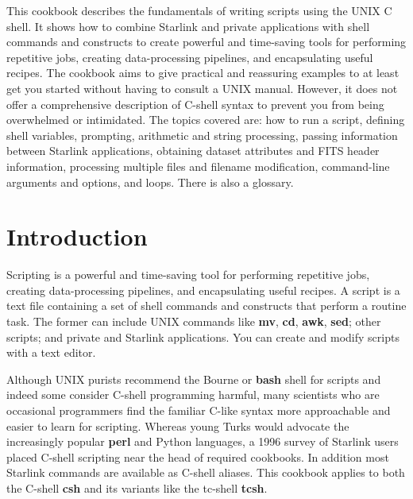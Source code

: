\documentclass[twoside,11pt]{article}
\newcommand{\stardocinitials}  {SC}
\newcommand{\stardocnumber}    {4.4}
\newcommand{\stardocabstract}  {
This cookbook describes the fundamentals of writing scripts using
the UNIX C shell.  It shows how to combine Starlink and private applications
with shell commands and constructs to create powerful and time-saving
tools for performing repetitive jobs, creating data-processing
pipelines, and encapsulating useful recipes.  The cookbook aims to give
practical and reassuring examples to at least get you started without
having to consult a UNIX manual.  However, it does not offer a
comprehensive description of C-shell syntax to prevent you from
being overwhelmed or intimidated.  The topics covered are: how to run a
script, defining shell variables, prompting, arithmetic and string
processing, passing information between Starlink applications, obtaining
dataset attributes and FITS header information, processing multiple
files and filename modification, command-line arguments and options, and
loops.  There is also a glossary.}
\newcommand{\stardocname}{\stardocinitials /\stardocnumber}
\newcommand{\htmladdnormallink}[2]{#1}
\newenvironment{latexonly}{}{}
\newcommand{\htmlref}[2]{#1}
\newcommand{\xlabel}[1]{}
\renewcommand{\thepage}{\roman{page}}
\begin{document}
\stardocabstract

\newpage
\begin{latexonly}
    \setlength{\parskip}{0mm}
    \tableofcontents
    \setlength{\parskip}{\medskipamount}
    \markboth{\stardocname}{\stardocname}
\end{latexonly}
\cleardoublepage
\renewcommand{\thepage}{\arabic{page}}
\setcounter{page}{1}


\section{\xlabel{sc4_se_intro}Introduction\label{sc4_se_intro}}

Scripting is a powerful and time-saving tool for performing repetitive
jobs, creating data-processing pipelines, and encapsulating useful
recipes.  A script is a text file containing a set of
\htmlref{{\sf shell}}{sc4_gl_she} commands and constructs that perform
a routine task.  The former can include UNIX commands like {\bf mv},
{\bf cd}, {\bf awk}, {\bf sed}; other scripts; and private and
Starlink applications.  You can create and modify scripts with a text
editor.

Although UNIX purists recommend the Bourne or {\bf bash} shell for
scripts and indeed some consider \htmladdnormallink{C-shell
programming
harmful}{http://www.unix.org.ua/orelly/unix/upt/ch47_02.htm}, many
scientists who are occasional programmers find the familiar C-like syntax
more approachable and easier to learn for scripting.  Whereas young
Turks would advocate the increasingly popular \htmladdnormallink{{\bf
perl}}{http://www.perl.com/} and
\htmladdnormallink{Python}{http://www.python.org/} languages, a 1996
survey of Starlink users placed C-shell scripting near the head of
required cookbooks.  In addition most Starlink commands are available
as C-shell aliases.  This cookbook applies to both the C-shell {\bf
csh} and its variants like the tc-shell {\bf tcsh}.
\end{document}
